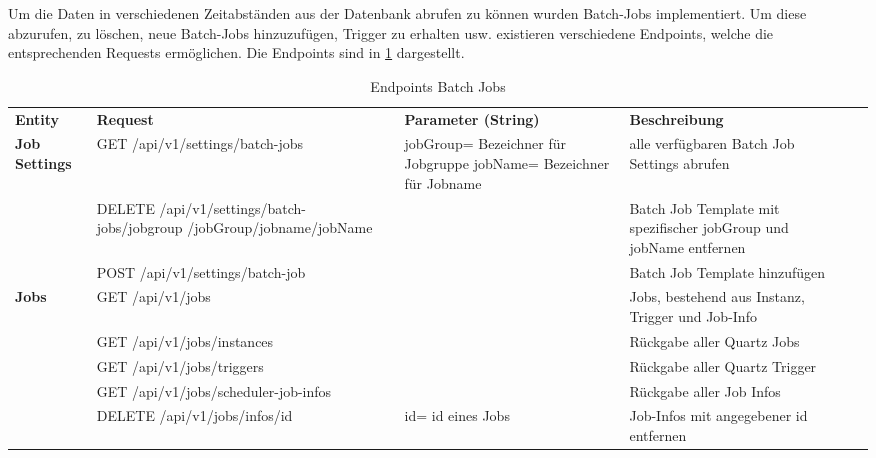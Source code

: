 \newpage
Um die Daten in verschiedenen Zeitabständen aus der Datenbank abrufen zu können wurden Batch-Jobs implementiert. Um diese abzurufen, zu löschen, neue Batch-Jobs hinzuzufügen, Trigger zu erhalten usw. existieren verschiedene Endpoints, welche die entsprechenden Requests ermöglichen. Die Endpoints sind in \ref{tab:endpointsBatch} dargestellt. 
\begin{table}[H]
\begin{tabular}{|l|p{}|p{3.5cm}|p{}|l}
\cline{1-4}
      \textbf{Entity}                    & \textbf{Request} & \textbf{Parameter (String)} & \textbf{Beschreibung} &  \\ \cline{1-4}
\multirow{3}{*}{\textbf{Job Settings}} & GET \newline /api/v1/settings/batch-jobs & jobGroup= \newline Bezeichner für Jobgruppe \newline jobName= \newline Bezeichner für Jobname  & alle verfügbaren Batch Job Settings abrufen &  \\ \cline{2-4}
                  & DELETE \newline /api/v1/settings/batch-jobs/jobgroup \newline/{jobGroup}/jobname/{jobName} &  & Batch Job Template mit spezifischer jobGroup und jobName entfernen  &  \\ \cline{2-4}
                  & POST \newline /api/v1/settings/batch-job &  & Batch Job Template hinzufügen  &  \\ \cline{1-4}
\multirow{5}{*}{\textbf{Jobs}} & GET /api/v1/jobs &  & Jobs, bestehend aus Instanz, Trigger und Job-Info  &  \\ \cline{2-4}
                  & GET /api/v1/jobs/instances &  & Rückgabe aller Quartz Jobs &  \\ \cline{2-4}
                  & GET /api/v1/jobs/triggers &  & Rückgabe aller Quartz Trigger &  \\ \cline{2-4}
                  & GET \newline /api/v1/jobs/scheduler-job-infos &  & Rückgabe aller Job Infos &  \\ \cline{2-4}
                  & DELETE \newline /api/v1/jobs/infos/{id} & id= id eines Jobs  & Job-Infos mit angegebener id entfernen &   \\ \cline{1-4}
\end{tabular}
\caption{Endpoints Batch Jobs}
\label{tab:endpointsBatch}
\end{table}
